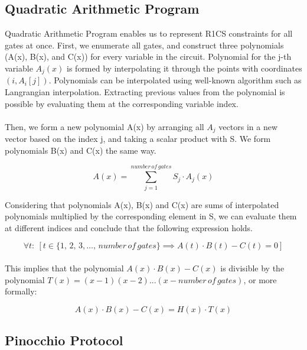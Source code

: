 \subsection{Quadratic Arithmetic Program}
Quadratic Arithmetic Program enables us to represent R1CS constraints for all gates at once. First, we enumerate all gates, and construct three polynomials (A(x), B(x), and C(x)) for every variable in the circuit. Polynomial for the j-th variable $A_j(x)$ is formed by interpolating it through the points with coordinates $(i, A_i[j])$. 
Polynomials can be interpolated using well-known algorithm such as Langrangian interpolation. Extracting previous values from the polynomial is possible by evaluating them at the corresponding variable index.\\
\\
Then, we form a new polynomial A(x) by arranging all $A_j$ vectors in a new vector based on the index j, and taking a scalar product with S. We form polynomials B(x) and C(x) the same way.

$$ A(x) = \sum_{j = 1}^{number\,of\,gates} S_j \cdot A_j(x) $$

Considering that polynomials A(x), B(x) and C(x) are sums of interpolated polynomials multiplied by the corresponding element in S, we can evaluate them at different indices and conclude that the following expression holds.

$$\forall t:\: [t \in \{1,\,2,\,3, \dots ,\,number\,of\,gates\} \implies A(t) \cdot B(t) - C(t) = 0]$$
\\
This implies that the polynomial $A(x) \cdot B(x) - C(x)$ is divisible by the polynomial $T(x) = (x-1)(x-2)...(x-number\,of\,gates)$, or more formally:

$$ A(x) \cdot B(x) - C(x) = H(x) \cdot T(x) $$

\subsection{Pinocchio Protocol}

